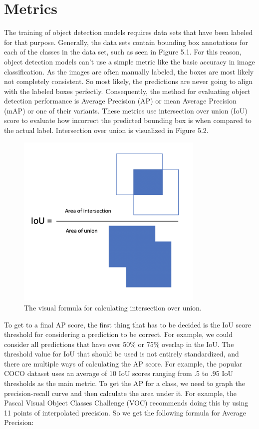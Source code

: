 \section{Metrics}
The training of object detection models requires data sets that have been labeled for that purpose.
Generally, the data sets contain bounding box annotations for each of the classes in the data set, such as seen in Figure 5.1.
For this reason, object detection models can't use a simple metric like the basic accuracy in image classification.
As the images are often manually labeled, the boxes are most likely not completely consistent.
So most likely, the predictions are never going to align with the labeled boxes perfectly.
Consequently, the method for evaluating object detection performance is Average Precision (AP) or mean Average Precision (mAP) or one of their variants.
These metrics use intersection over union (IoU) score to evaluate how incorrect the predicted bounding box is when compared to the actual label. Intersection over union is visualized in Figure 5.2.

\begin{figure}[h!]
    \centering
    \includegraphics[width=0.8\textwidth]{imgs/IoU-own.png}
    \caption{The visual formula for calculating intersection over union.}
\end{figure}

To get to a final AP score, the first thing that has to be decided is the IoU score threshold for considering a prediction to be correct.
For example, we could consider all predictions that have over 50\% or 75\% overlap in the IoU.
The threshold value for IoU that should be used is not entirely standardized, and there are multiple ways of calculating the AP score.
For example, the popular COCO dataset \citep{COCO} uses an average of 10 IoU scores ranging from .5 to .95 IoU thresholds as the main metric.
To get the AP for a class, we need to graph the precision-recall curve and then calculate the area under it.
For example, the Pascal Visual Object Classes Challenge (VOC) \citep{PVOC} recommends doing this by using 11 points of interpolated precision.
So we get the following formula for Average Precision:

